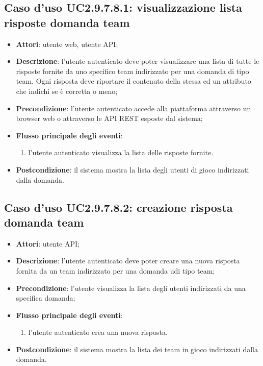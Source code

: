 \subsection{Caso d'uso UC2.9.7.8.1: visualizzazione lista risposte domanda team}
\begin{itemize}
\item \textbf{Attori}: utente web, utente API;
\item \textbf{Descrizione}: l'utente autenticato deve poter visualizzare una lista di tutte le risposte fornite da uno specifico team indirizzato per una domanda di tipo team. Ogni risposta deve riportare il contenuto della stessa ed un attributo che indichi se è corretta o meno; 
      \item \textbf{Precondizione}: 	l'utente autenticato accede alla piattaforma attraverso un browser web o attraverso le API REST esposte dal sistema;

        \item \textbf{Flusso principale degli eventi}:
          \begin{enumerate}
          \item l'utente autenticato visualizza la lista delle risposte fornite.

      \end{enumerate}
    \item \textbf{Postcondizione}: il sistema mostra la lista degli utenti di gioco indirizzati dalla domanda.
  \end{itemize}
\hypertarget{UC2.9.7.8.2}{}
\subsection{Caso d'uso UC2.9.7.8.2: creazione risposta domanda team}
\begin{itemize}
\item \textbf{Attori}: utente API;
\item \textbf{Descrizione}: l'utente autenticato deve poter creare una nuova risposta fornita da un team indirizzato per una domanda udi tipo team; 
      \item \textbf{Precondizione}: l'utente visualizza la lista degli utenti indirizzati da una specifica domanda;

        \item \textbf{Flusso principale degli eventi}:
          \begin{enumerate}
          \item l'utente autenticato crea una nuova risposta.

      \end{enumerate}
    \item \textbf{Postcondizione}: il sistema mostra la lista dei team in gioco indirizzati dalla domanda.
  \end{itemize}

